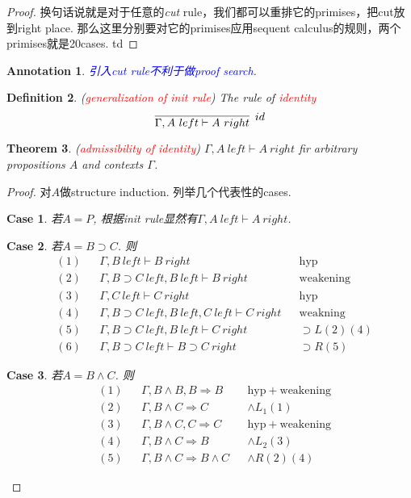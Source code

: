 \documentclass{article}
\theoremstyle{plain}
\newtheorem{theorem}{Theorem}
\newtheorem{definition}[theorem]{Definition}
\newtheorem{annotation}[theorem]{Annotation}
\newcounter{case}
\newtheorem{case}{Case}
\theoremstyle{nonumberplain}
\newtheorem{proof}{Proof}
\newcommand{\redt}[1]{\textcolor{red}{#1}}
\newcommand{\bluet}[1]{\textcolor{blue}{#1}}
\begin{document}
\begin{proof}
换句话说就是对于任意的\emph{cut} rule，我们都可以重排它的primises，把cut放到right place. 那么这里分别要对它的primises应用sequent calculus的规则，两个primises就是20cases. td
\end{proof}


\begin{annotation}
\rm \bluet{引入\emph{cut} rule不利于做proof search}. 
\end{annotation}


\begin{definition}\label{identity-rule}
\rm (\redt{generalization of \emph{init} rule}) The rule of \redt{identity}
$$
\infer[id]{\Gamma, A~left \vdash A~right}{}
$$
\end{definition}

\begin{theorem}
\rm (\redt{admissibility of identity}) $\Gamma, A~left \vdash A~right$ fir arbitrary propositions $A$ and contexts $\Gamma$.
\end{theorem}

\begin{proof}
\rm 对$A$做structure induction. 列举几个代表性的cases.
\begin{case}若$A = P$, 根据\emph{init} rule显然有$\Gamma,A~left \vdash A~right$.
\end{case}
\begin{case}若$A = B \supset C$. 则
$$
\begin{aligned}
&(1) && \Gamma, B~left \vdash B~right && \text{hyp} \\
&(2) && \Gamma, B \supset C~left, B~left \vdash B~right && \text{weakening} \\
&(3) && \Gamma, C~left \vdash C~right && \text{hyp} \\
&(4) && \Gamma, B \supset C~left, B~left,C~left \vdash C~right && \text{weakning} \\
&(5) && \Gamma, B \supset C~left, B~left \vdash C~right && \supset L (2)(4)\\
&(6) && \Gamma, B \supset C~left \vdash B \supset C~right&& \supset R(5)
\end{aligned}
$$
\end{case}
\begin{case}若$A = B \wedge C$. 则
$$
\begin{aligned}
&(1) && \Gamma, B \wedge B, B \Rightarrow B &&  \text{hyp}~+~\text{weakening} \\ 
&(2) && \Gamma, B \wedge C \Rightarrow C && \wedge L_1(1)\\
&(3) && \Gamma, B \wedge C, C \Rightarrow C &&  \text{hyp}~+~\text{weakening}\\
&(4) && \Gamma, B \wedge C \Rightarrow B && \wedge L_2(3)\\
&(5) && \Gamma, B \wedge C \Rightarrow B \wedge C && \wedge R(2)(4) 
\end{aligned}
$$
\end{case}
\end{proof}
\end{document}
